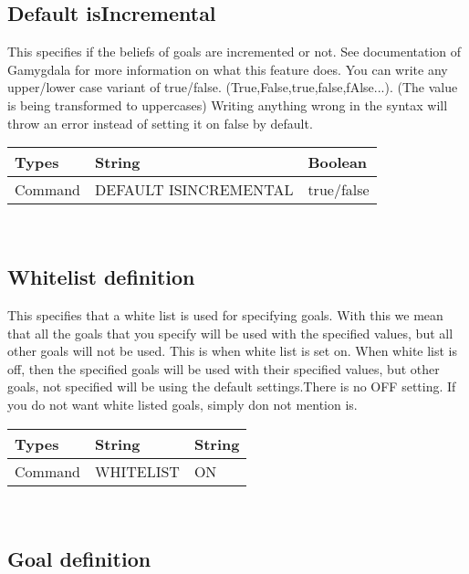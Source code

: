 \documentclass{scrartcl}
\begin{document}
\subsection{Default isIncremental}
This specifies if the beliefs of goals are incremented or not. See documentation of Gamygdala for more information on what this feature does.
You can write any upper/lower case variant of true/false. (True,False,true,false,fAlse...). (The value is being transformed to uppercases)
Writing anything wrong in the syntax will throw an error instead of setting it on false by default.\\
\begin{tabular}{|l|l|l|}
	\hline  Types & String & Boolean  \\ 
	\hline  Command & DEFAULT ISINCREMENTAL & true/false  \\ 
	\hline 
\end{tabular}
\\

\pagebreak
\subsection{Whitelist definition}
This specifies that a white list is used for specifying goals. With this we mean that all the goals that you specify will be used with the specified values, but all other goals will not be used. This is when white list is set on. When white list is off, then the specified goals will be used with their specified values, but other goals, not specified will be using the default settings.There is no OFF setting. If you do not want  white listed goals, simply don not mention is.\\
\begin{tabular}{|l|l|l|}
	\hline  Types & String & String  \\ 
	\hline  Command & WHITELIST & ON  \\ 
	\hline  
\end{tabular}
\\

\subsection{Goal definition}
\end{document}
